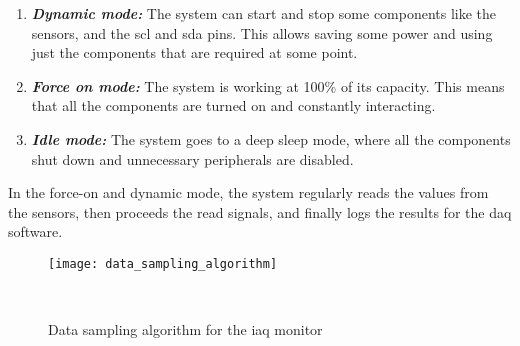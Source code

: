 \begin{enumerate}
    \item \textbf{\textit{Dynamic mode:}} The system can start and stop some components like the sensors, and the \acrshort{scl} and \acrshort{sda} pins. This allows saving some power and using just the components that are required at some point.

    \item \textbf{\textit{Force on mode:}} The system is working at 100\% of its capacity. This means that all the components are turned on and constantly interacting.

    \item \textbf{\textit{Idle mode:}} The system goes to a deep sleep mode, where all the components shut down and unnecessary peripherals are disabled.
\end{enumerate}

In the force-on and dynamic mode, the system regularly reads the values from the sensors, then proceeds the read signals, and finally logs the results for the \acrshort{daq} software.

\begin{figure}[H]
    \centering
    \texttt{[image: data\_sampling\_algorithm]}
    \caption{Data sampling algorithm for the \acrshort{iaq} monitor}
~\label{fig:data_sampling_algorithm}
\end{figure}

